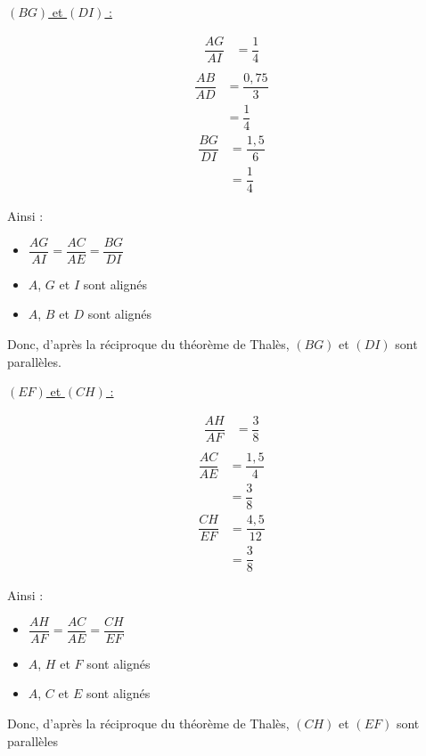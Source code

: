 \begin{multicols}{2}
  \underline{$(BG)$ et $(DI)$ :}

  \begin{multicols}{3}
    \noindent
    \begin{align*}
        \dfrac{AG}{AI}&=\dfrac{1}{4}\\
    \end{align*}
    \begin{align*}
        \dfrac{AB}{AD}&=\dfrac{0,75}{3}\\
        &=\dfrac{1}{4}
    \end{align*}
    \begin{align*}
        \dfrac{BG}{DI}&=\dfrac{1,5}{6}\\
        &=\dfrac{1}{4}
    \end{align*}
\end{multicols}
\vspace{-1.75em }
Ainsi :
\begin{itemize}
    \item $\dfrac{AG}{AI}=\dfrac{AC}{AE}=\dfrac{BG}{DI}$\vspace{0.25em}
    \item $A$, $G$ et $I$ sont alignés
    \item $A$, $B$ et $D$ sont alignés
\end{itemize}
Donc, d'après la réciproque du théorème de Thalès, $(BG)$ et $(DI)$ sont parallèles.
  
  \underline{$(EF)$ et $(CH)$ :}

  \begin{multicols}{3}
    \noindent
    \begin{align*}
        \dfrac{AH}{AF}&=\dfrac{3}{8}\\
    \end{align*}
    \begin{align*}
        \dfrac{AC}{AE}&=\dfrac{1,5}{4}\\
        &=\dfrac{3}{8}
    \end{align*}
    \begin{align*}
        \dfrac{CH}{EF}&=\dfrac{4,5}{12}\\
        &=\dfrac{3}{8}
    \end{align*}
\end{multicols}
\vspace{-1.75em }
Ainsi :
\begin{itemize}
    \item $\dfrac{AH}{AF}=\dfrac{AC}{AE}=\dfrac{CH}{EF}$\vspace{0.25em}
    \item $A$, $H$ et $F$ sont alignés
    \item $A$, $C$ et $E$ sont alignés
\end{itemize}
Donc, d'après la réciproque du théorème de Thalès, $(CH)$ et $(EF)$ sont parallèles
\end{multicols}

